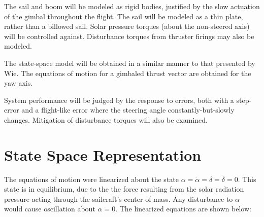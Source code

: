 \documentclass[]{aiaa-tc}%
\begin{document}
The sail and boom will be modeled as rigid bodies, justified by the slow actuation of the gimbal throughout the flight. The sail will be modeled as a thin plate, rather than a billowed sail. Solar pressure torques (about the non-steered axis) will be controlled against. Disturbance torques from thruster firings may also be modeled. 
	
	\vspace{5 mm}

The state-space model will be obtained in a similar manner to that presented by Wie. The equations of motion for a gimbaled thrust vector are obtained for the yaw axis. 
	
	\vspace{5 mm}

System performance will be judged by the response to errors, both with a step-error and a flight-like error where the steering angle constantly-but-slowly changes. Mitigation of disturbance torques will also be examined.

	\section{State Space Representation}

	The equations of motion were linearized about the state $\alpha = \dot{\alpha} = \delta = \dot{\delta} =0$. This state is in equilibrium, due to the the force resulting from the solar radiation pressure acting through the sailcraft's center of mass.  Any disturbance to $\alpha$ would cause oscillation about $\alpha=0$. The linearized equations are shown below:
\end{document}
